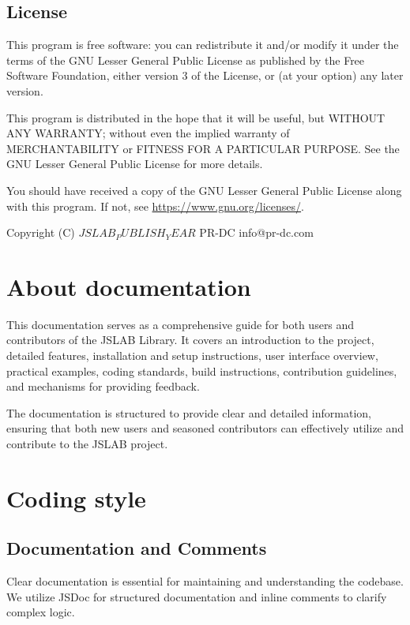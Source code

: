 \documentclass[12pt,a4paper]{article}
\newcommand{\yearvar}{$JSLAB_PUBLISH_YEAR$}
\begin{document}
\subsection{License}
This program is free software: you can redistribute it and/or modify it under the terms of the GNU Lesser General Public License as published by the Free Software Foundation, either version 3 of the License, or (at your option) any later version.

This program is distributed in the hope that it will be useful, but WITHOUT ANY WARRANTY; without even the implied warranty of MERCHANTABILITY or FITNESS FOR A PARTICULAR PURPOSE. See the GNU Lesser General Public License for more details.

You should have received a copy of the GNU Lesser General Public License along with this program. If not, see \url{https://www.gnu.org/licenses/}.

\vspace{5mm}

Copyright (C) \yearvar\; PR-DC info@pr-dc.com

\vspace{8mm}

\section{About documentation}

This documentation serves as a comprehensive guide for both users and contributors of the JSLAB Library. It covers an introduction to the project, detailed features, installation and setup instructions, user interface overview, practical examples, coding standards, build instructions, contribution guidelines, and mechanisms for providing feedback.

The documentation is structured to provide clear and detailed information, ensuring that both new users and seasoned contributors can effectively utilize and contribute to the JSLAB project.

\section{Coding style}
\label{coding-style}

\subsection{Documentation and Comments}

Clear documentation is essential for maintaining and understanding the codebase. We utilize JSDoc for structured documentation and inline comments to clarify complex logic.
\end{document}
